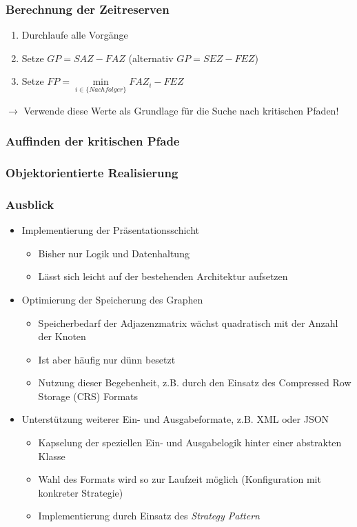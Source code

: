 \documentclass[ngerman, t]{beamer}
\begin{document}
\begin{frame}
  \frametitle{Berechnung der Zeitreserven}
  \begin{enumerate}
    \item Durchlaufe alle Vorg\"ange
    \item Setze $GP=SAZ-FAZ$ (alternativ $GP=SEZ-FEZ$)
    \item Setze $FP=\min\limits_{i \in \{Nachfolger\}} FAZ_i - FEZ$
  \end{enumerate}
  $\rightarrow$ Verwende diese Werte als Grundlage f\"ur die Suche
  nach kritischen Pfaden!
\end{frame}

\begin{frame}
  \frametitle{Auffinden der kritischen Pfade}
  \begin{figure}
    \resizebox{!}{100px}{}
  \end{figure}
\end{frame}

\begin{frame}
  \frametitle{Objektorientierte Realisierung}
  \begin{figure}
    \resizebox{!}{200px}{
      
    }
  \end{figure}
\end{frame}

\begin{frame}
  \frametitle{Ausblick}
  \begin{itemize}
    \item Implementierung der Pr\"asentationsschicht
      \begin{itemize}
        \item Bisher nur Logik und Datenhaltung
        \item L\"asst sich leicht auf der bestehenden Architektur
          aufsetzen
      \end{itemize}
    \item Optimierung der Speicherung des Graphen
      \begin{itemize}
        \item Speicherbedarf der Adjazenzmatrix w\"achst quadratisch
          mit der Anzahl der Knoten
        \item Ist aber h\"aufig nur d\"unn besetzt
        \item Nutzung dieser Begebenheit, z.B. durch den Einsatz des
          Compressed Row Storage (CRS) Formats
      \end{itemize}
    \item Unterst\"utzung weiterer Ein- und Ausgabeformate, z.B. XML
      oder JSON
      \begin{itemize}
        \item Kapselung der speziellen Ein- und Ausgabelogik hinter
          einer abstrakten Klasse
        \item Wahl des Formats wird so zur Laufzeit m\"oglich
          (Konfiguration mit konkreter Strategie)
        \item Implementierung durch Einsatz des \textit{Strategy Pattern}
      \end{itemize}
  \end{itemize}
\end{frame}
\end{document}
